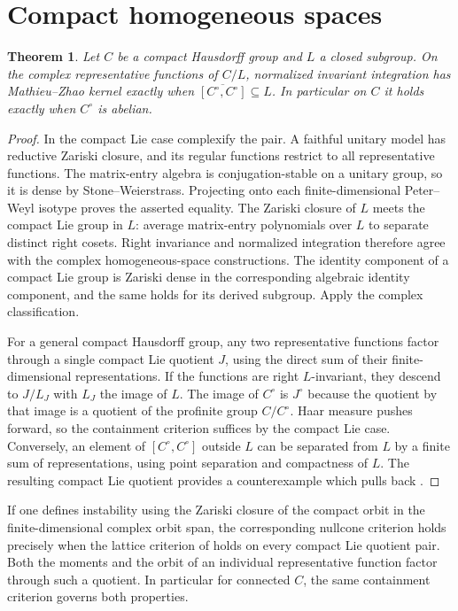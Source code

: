 \documentclass[11pt]{article}
\newtheorem{theorem}{Theorem}[section]
\begin{document}
\section{Compact homogeneous spaces}

\begin{theorem}\label{thm:compact}
Let \(C\) be a compact Hausdorff group and \(L\) a closed subgroup.
On the complex representative functions of \(C/L\), normalized
invariant integration has Mathieu--Zhao kernel exactly when
\(\overline{[C^\circ,C^\circ]}\subseteq L\). In particular on \(C\)
it holds exactly when \(C^\circ\) is abelian.
\end{theorem}

\begin{proof}
In the compact Lie case complexify the pair. A faithful unitary
model has reductive Zariski closure, and its regular functions
restrict to all representative functions. The matrix-entry algebra
is conjugation-stable on a unitary group, so it is dense by
Stone--Weierstrass. Projecting onto each finite-dimensional
Peter--Weyl isotype proves the asserted equality. The Zariski
closure of \(L\) meets the compact Lie group in \(L\): average
matrix-entry polynomials over \(L\) to separate distinct right
cosets. Right invariance and normalized integration therefore agree
with the complex homogeneous-space constructions. The identity
component of a compact Lie group is Zariski dense in the corresponding
algebraic identity component, and the same holds for its derived
subgroup. Apply the complex classification.

For a general compact Hausdorff group, any two representative functions
factor through a single compact Lie quotient \(J\), using the direct
sum of their finite-dimensional representations. If the functions
are right \(L\)-invariant, they descend to \(J/L_J\) with
\(L_J\) the image of \(L\). The image of \(C^\circ\) is \(J^\circ\)
because the quotient by that image is a quotient of the profinite
group \(C/C^\circ\). Haar measure pushes forward, so the containment
criterion suffices by the compact Lie case. Conversely, an element
of \([C^\circ,C^\circ]\) outside \(L\) can be separated from \(L\)
by a finite sum of representations, using point separation and
compactness of \(L\). The resulting compact Lie quotient provides
a counterexample which pulls back \cite{Fausk}.
\end{proof}

If one defines instability using the Zariski closure of the compact
orbit in the finite-dimensional complex orbit span, the corresponding
nullcone criterion holds precisely when the lattice criterion of
\cite[Section~7]{Complex} holds on every compact Lie quotient pair.
Both the moments and the orbit of an individual representative
function factor through such a quotient. In particular for connected
\(C\), the same containment criterion governs both properties.
\end{document}
